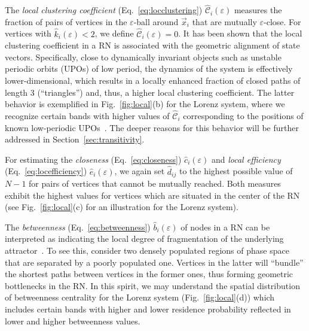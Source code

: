			The \textit{local clustering coefficient} (Eq.~\ref{eq:locclustering}) $\hat{\mathcal{C}}_i(\varepsilon)$ measures the fraction of pairs of vertices in the $\varepsilon$-ball around $\vec{x}_i$ that are mutually $\varepsilon$-close. For vertices with $\hat{k}_i(\varepsilon)<2$, we define $\hat{\mathcal{C}}_i(\varepsilon)=0$. It has been shown that the local clustering coefficient in a RN is associated with the geometric alignment of state vectors. Specifically, close to dynamically invariant objects such as unstable periodic orbits (UPOs) of low period, the dynamics of the system is effectively lower-dimensional, which results in a locally enhanced fraction of closed paths of length 3 (``triangles'') and, thus, a higher local clustering coefficient. The latter behavior is exemplified in Fig.~\ref{fig:local}(b) for the Lorenz system, where we recognize certain bands with higher values of $\hat{\mathcal{C}}_i$ corresponding to the positions of known low-periodic UPOs~\cite{Donner2010a}. The deeper reasons for this behavior will be further addressed in Section~\ref{sec:transitivity}.

			For estimating the \textit{closeness} (Eq.~\ref{eq:closeness}) $\hat{c}_i(\varepsilon)$ and \textit{local efficiency} (Eq.~\ref{eq:locefficiency}) $\hat{e}_i(\varepsilon)$, we again set $\hat{d}_{ij}$ to the highest possible value of $N-1$ for pairs of vertices that cannot be mutually reached. Both measures exhibit the highest values for vertices which are situated in the center of the RN (see Fig.~\ref{fig:local}(c) for an illustration for the Lorenz system).

			The \textit{betweenness} (Eq.~\ref{eq:betweenness}) $\hat{b}_i(\varepsilon)$ of nodes in a RN can be interpreted as indicating the local degree of fragmentation of the underlying attractor~\cite{Donner2010a}. To see this, consider two densely populated regions of phase space that are separated by a poorly populated one. Vertices in the latter will ``bundle'' the shortest paths between vertices in the former ones, thus forming geometric bottlenecks in the RN. In this spirit, we may understand the spatial distribution of betweenness centrality for the Lorenz system (Fig.~\ref{fig:local}(d)) which includes certain bands with higher and lower residence probability reflected in lower and higher betweenness values.


